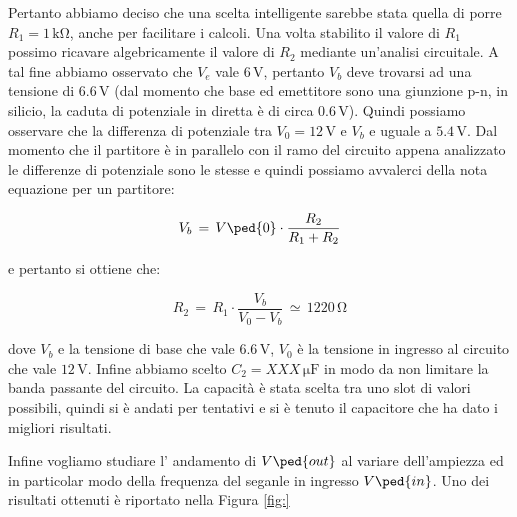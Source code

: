 Pertanto abbiamo deciso che una scelta intelligente sarebbe stata quella di porre $R_1=1\,\si{\kilo\ohm}$, anche per facilitare i calcoli. Una volta stabilito il valore di $R_1$ possimo ricavare algebricamente il valore di $R_2$ mediante un'analisi circuitale.
A tal fine abbiamo osservato che $V_e$ vale $6\,\si{\volt}$, pertanto $V_b$ deve trovarsi ad una tensione di $6.6\,\si{\volt}$ (dal momento che base ed emettitore sono una giunzione p-n, in silicio, la caduta di potenziale in diretta è di circa $0.6\,\si{\volt}$). Quindi possiamo osservare che la differenza di potenziale tra $V_0=12\,\si{\volt}$ e $V_b$ e uguale a $5.4\,\si{\volt}$.
Dal momento che il partitore è in parallelo con il ramo del circuito appena analizzato le differenze di potenziale sono le stesse e quindi possiamo avvalerci della nota equazione per un partitore:

\begin{equation}
        V_b\,=\,V\ped{0}\cdot\frac{R_2}{R_1+R_2}
\end{equation}

e pertanto si ottiene che:

\begin{equation}
        R_2\,=\,R_1\cdot\frac{V_b}{V_0-V_b} \,\simeq\, 1220\,\si{\ohm}
\end{equation}

dove $V_b$ e la tensione di base che vale $6.6\,\si{\volt}$, $V_0$ è la tensione in ingresso al circuito che vale $12\,\si{\volt}$.
Infine abbiamo scelto $C_2=XXX\,\si{\micro\farad}$ in modo da non limitare la banda passante del circuito. La capacità è stata scelta tra uno slot di valori possibili, quindi si è andati per tentativi e si è tenuto il capacitore che ha dato i migliori risultati.

Infine vogliamo studiare l' andamento di $V\ped{out}$ al variare dell'ampiezza ed in particolar modo della frequenza del seganle in ingresso $V\ped{in}$. Uno dei risultati ottenuti è riportato nella Figura \ref{fig:}
